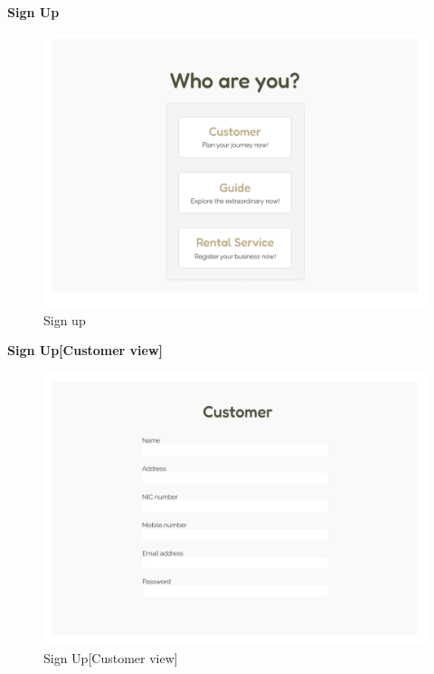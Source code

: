 \textbf{Sign Up}\\
\begin{figure}[h!]
    \centering
    \includegraphics[width=1\textwidth]{Images/Wireframes/Sign up main.png}
    \caption{Sign up}
\end{figure}
\clearpage

\textbf{Sign Up[Customer view]}\\
\begin{figure}[h!]
    \centering
    \includegraphics[width=1\textwidth]{Images/Wireframes/Signup - Customer.png}
    \caption{Sign Up[Customer view]}
\end{figure}
\clearpage


